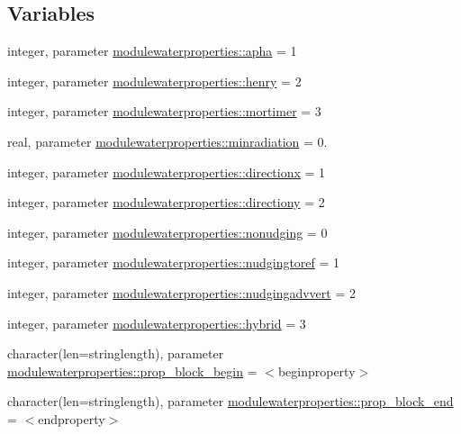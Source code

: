 \subsection*{Variables}
\begin{DoxyCompactItemize}
\item 
integer, parameter \mbox{\hyperlink{namespacemodulewaterproperties_ad3d25ef03f7249eeb914147244f7ab21}{modulewaterproperties\+::apha}} = 1
\item 
integer, parameter \mbox{\hyperlink{namespacemodulewaterproperties_a29e2fbba778edc06bcf727039bbd9798}{modulewaterproperties\+::henry}} = 2
\item 
integer, parameter \mbox{\hyperlink{namespacemodulewaterproperties_a6bcd9e391a74b1ca62e61cc243476fdc}{modulewaterproperties\+::mortimer}} = 3
\item 
real, parameter \mbox{\hyperlink{namespacemodulewaterproperties_a25034c41764dc77e32aba6c415fcc49d}{modulewaterproperties\+::minradiation}} = 0.
\item 
integer, parameter \mbox{\hyperlink{namespacemodulewaterproperties_ad679645e03dadde260138305d457c6b0}{modulewaterproperties\+::directionx}} = 1
\item 
integer, parameter \mbox{\hyperlink{namespacemodulewaterproperties_aaf6db3a146aad58618195cc2c0205df5}{modulewaterproperties\+::directiony}} = 2
\item 
integer, parameter \mbox{\hyperlink{namespacemodulewaterproperties_aff38a3e9a22cffe62976100b9a502857}{modulewaterproperties\+::nonudging}} = 0
\item 
integer, parameter \mbox{\hyperlink{namespacemodulewaterproperties_a11b343623ee8be4de6631eeaebc7960f}{modulewaterproperties\+::nudgingtoref}} = 1
\item 
integer, parameter \mbox{\hyperlink{namespacemodulewaterproperties_a5526d1183ef0c5a2ac7a8102b28c7d15}{modulewaterproperties\+::nudgingadvvert}} = 2
\item 
integer, parameter \mbox{\hyperlink{namespacemodulewaterproperties_aeb738ab690aa82280436c15d6500e8c3}{modulewaterproperties\+::hybrid}} = 3
\item 
character(len=stringlength), parameter \mbox{\hyperlink{namespacemodulewaterproperties_a116b016e9840d891b6aa364194ef54a4}{modulewaterproperties\+::prop\+\_\+block\+\_\+begin}} = \textquotesingle{}$<$beginproperty$>$\textquotesingle{}
\item 
character(len=stringlength), parameter \mbox{\hyperlink{namespacemodulewaterproperties_a6ebea2163c7a405c3147a1c638cccd1f}{modulewaterproperties\+::prop\+\_\+block\+\_\+end}} = \textquotesingle{}$<$endproperty$>$\textquotesingle{}

\end{DoxyCompactItemize}
